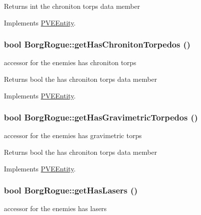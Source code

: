 \begin{DoxyReturn}{Returns}
int the chroniton torps data member 
\end{DoxyReturn}


Implements \hyperlink{classPVEEntity}{PVEEntity}.

\hypertarget{classBorgRogue_a8e4728091fa86cc8cf1122975f4fd9e4}{
\subsubsection[{getHasChronitonTorpedos}]{\setlength{\rightskip}{0pt plus 5cm}bool BorgRogue::getHasChronitonTorpedos ()}}
\label{db/d4f/classBorgRogue_a8e4728091fa86cc8cf1122975f4fd9e4}
accessor for the enemies has chroniton torps

\begin{DoxyReturn}{Returns}
bool the has chroniton torps data member 
\end{DoxyReturn}


Implements \hyperlink{classPVEEntity}{PVEEntity}.

\hypertarget{classBorgRogue_a1f4fd1ce4d664b532c7095513f530241}{
\subsubsection[{getHasGravimetricTorpedos}]{\setlength{\rightskip}{0pt plus 5cm}bool BorgRogue::getHasGravimetricTorpedos ()}}
\label{db/d4f/classBorgRogue_a1f4fd1ce4d664b532c7095513f530241}
accessor for the enemies has gravimetric torps

\begin{DoxyReturn}{Returns}
bool the has chroniton torps data member 
\end{DoxyReturn}


Implements \hyperlink{classPVEEntity}{PVEEntity}.

\hypertarget{classBorgRogue_a9a32c764b84654af68bfcc3fc934460c}{
\subsubsection[{getHasLasers}]{\setlength{\rightskip}{0pt plus 5cm}bool BorgRogue::getHasLasers ()}}
\label{db/d4f/classBorgRogue_a9a32c764b84654af68bfcc3fc934460c}
accessor for the enemies has lasers

